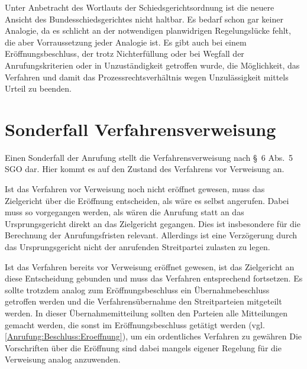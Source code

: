 Unter Anbetracht des Wortlauts der Schiedsgerichtsordnung ist die neuere Ansicht des Bundesschiedsgerichtes nicht haltbar.
Es bedarf schon gar keiner Analogie, da es schlicht an der notwendigen planwidrigen Regelungslücke fehlt, die aber Vorraussetzung jeder Analogie ist.
Es gibt auch bei einem Eröffnungsbeschluss, der trotz Nichterfüllung oder bei Wegfall der Anrufungskriterien oder in Unzuständigkeit getroffen wurde, die Möglichkeit, das Verfahren und damit das Prozessrechtsverhältnis wegen Unzulässigkeit mittels Urteil zu beenden.

\section{Sonderfall Verfahrensverweisung}
\label{Anrufung:Verweisung}
Einen Sonderfall der Anrufung stellt die Verfahrensverweisung nach \S~6 Abs.~5 SGO dar. Hier kommt es auf den Zustand des Verfahrens vor Verweisung an.

Ist das Verfahren vor Verweisung noch nicht eröffnet gewesen, muss das Zielgericht über die Eröffnung entscheiden, als wäre es selbst angerufen.
Dabei muss so vorgegangen werden, als wären die Anrufung statt an das Ursprungsgericht direkt an das Zielgericht gegangen.
Dies ist insbesondere für die Berechnung der Anrufungsfristen relevant.
Allerdings ist eine Verzögerung durch das Ursprungsgericht nicht der anrufenden Streitpartei zulasten zu legen.

Ist das Verfahren bereits vor Verweisung eröffnet gewesen, ist das Zielgericht an diese Entscheidung gebunden und muss das Verfahren entsprechend fortsetzen.
Es sollte trotzdem analog zum Eröffnungsbeschluss ein Übernahmebeschluss getroffen werden und die Verfahrensübernahme den Streitparteien mitgeteilt werden.
In dieser Übernahmemitteilung sollten den Parteien alle Mitteilungen gemacht werden, die sonst im Eröffnungsbeschluss getätigt werden (vgl. \ref{Anrufung:Beschluss:Eroeffnung}), um ein ordentliches Verfahren zu gewähren
Die Vorschriften über die Eröffnung sind dabei mangels eigener Regelung für die Verweisung analog anzuwenden.


